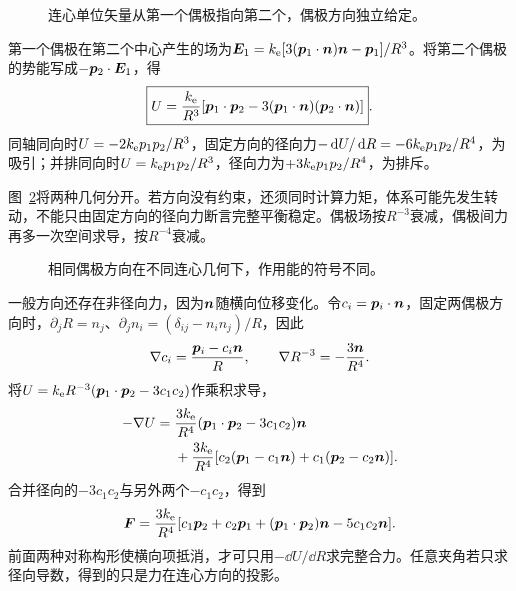 \begin{figure}[H]\centering
{}
\caption{连心单位矢量从第一个偶极指向第二个，偶极方向独立给定。}\label{fig:es1-h7-q}
\end{figure}
\begin{solution}
第一个偶极在第二个中心产生的场为$\bm{E}_1=k_{\rm e}[3(\bm{p}_1\cdot\bm{n})\bm{n}-\bm{p}_1]/R^3$。将第二个偶极的势能写成$-\bm{p}_2\cdot\bm{E}_1$，得
\[\boxed{U=\frac{k_{\rm e}}{R^3}[\bm{p}_1\cdot\bm{p}_2
-3(\bm{p}_1\cdot\bm{n})(\bm{p}_2\cdot\bm{n})]}.\]
同轴同向时$U=-2k_{\rm e} p_1p_2/R^3$，固定方向的径向力$-\mathop{}\!\mathrm d U/\mathop{}\!\mathrm d R=-6k_{\rm e} p_1p_2/R^4$，为吸引；并排同向时$U=k_{\rm e} p_1p_2/R^3$，径向力为$+3k_{\rm e} p_1p_2/R^4$，为排斥。

图~\ref{fig:es1-h7-s}将两种几何分开。若方向没有约束，还须同时计算力矩，体系可能先发生转动，不能只由固定方向的径向力断言完整平衡稳定。偶极场按$R^{-3}$衰减，偶极间力再多一次空间求导，按$R^{-4}$衰减。
\begin{figure}[H]\centering
{}
\caption{相同偶极方向在不同连心几何下，作用能的符号不同。}\label{fig:es1-h7-s}
\end{figure}


一般方向还存在非径向力，因为$\bm{n}$随横向位移变化。令$c_i=\bm{p}_i\cdot\bm{n}$，固定两偶极方向时，$\partial_jR=n_j$、$\partial_jn_i=(\delta_{ij}-n_in_j)/R$，因此
\[\nabla c_i=\frac{\bm{p}_i-c_i\bm{n}}{R},\qquad
\nabla R^{-3}=-\frac{3\bm{n}}{R^4}.
\]
将$U=k_{\rm e} R^{-3}(\bm{p}_1\cdot\bm{p}_2-3c_1c_2)$作乘积求导，
\[\begin{split}
-\nabla U={}&\frac{3k_{\rm e}}{R^4}(\bm{p}_1\cdot\bm{p}_2-3c_1c_2)\bm{n}\\
&+\frac{3k_{\rm e}}{R^4}[c_2(\bm{p}_1-c_1\bm{n})+c_1(\bm{p}_2-c_2\bm{n})].
\end{split}\]
合并径向的$-3c_1c_2$与另外两个$-c_1c_2$，得到
\[\bm{F}=\frac{3k_{\rm e}}{R^4}[c_1\bm{p}_2+c_2\bm{p}_1+(\bm{p}_1\cdot\bm{p}_2)\bm{n}-5c_1c_2\bm{n}].\]
前面两种对称构形使横向项抵消，才可只用$-\dd U/\dd R$求完整合力。任意夹角若只求径向导数，得到的只是力在连心方向的投影。
\end{solution}

